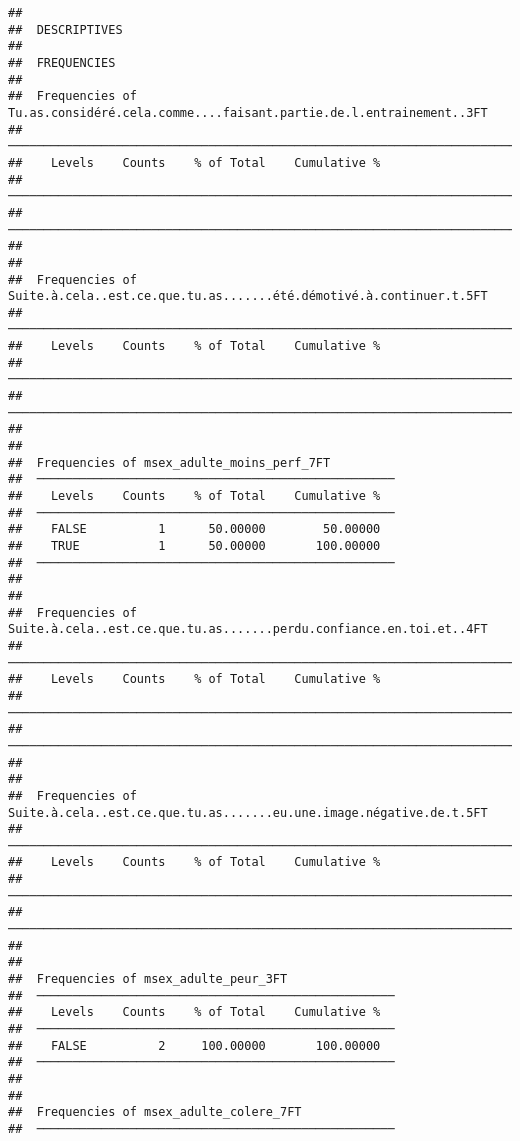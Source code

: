 \documentclass[
]{article}
\begin{document}
\begin{verbatim}
## 
##  DESCRIPTIVES
## 
##  FREQUENCIES
## 
##  Frequencies of Tu.as.considéré.cela.comme....faisant.partie.de.l.entrainement..3FT 
##  ────────────────────────────────────────────────────────────────────────────────── 
##    Levels    Counts    % of Total    Cumulative %   
##  ────────────────────────────────────────────────────────────────────────────────── 
##  ────────────────────────────────────────────────────────────────────────────────── 
## 
## 
##  Frequencies of Suite.à.cela..est.ce.que.tu.as.......été.démotivé.à.continuer.t.5FT 
##  ────────────────────────────────────────────────────────────────────────────────── 
##    Levels    Counts    % of Total    Cumulative %   
##  ────────────────────────────────────────────────────────────────────────────────── 
##  ────────────────────────────────────────────────────────────────────────────────── 
## 
## 
##  Frequencies of msex_adulte_moins_perf_7FT          
##  ────────────────────────────────────────────────── 
##    Levels    Counts    % of Total    Cumulative %   
##  ────────────────────────────────────────────────── 
##    FALSE          1      50.00000        50.00000   
##    TRUE           1      50.00000       100.00000   
##  ────────────────────────────────────────────────── 
## 
## 
##  Frequencies of Suite.à.cela..est.ce.que.tu.as.......perdu.confiance.en.toi.et..4FT 
##  ────────────────────────────────────────────────────────────────────────────────── 
##    Levels    Counts    % of Total    Cumulative %   
##  ────────────────────────────────────────────────────────────────────────────────── 
##  ────────────────────────────────────────────────────────────────────────────────── 
## 
## 
##  Frequencies of Suite.à.cela..est.ce.que.tu.as.......eu.une.image.négative.de.t.5FT 
##  ────────────────────────────────────────────────────────────────────────────────── 
##    Levels    Counts    % of Total    Cumulative %   
##  ────────────────────────────────────────────────────────────────────────────────── 
##  ────────────────────────────────────────────────────────────────────────────────── 
## 
## 
##  Frequencies of msex_adulte_peur_3FT                
##  ────────────────────────────────────────────────── 
##    Levels    Counts    % of Total    Cumulative %   
##  ────────────────────────────────────────────────── 
##    FALSE          2     100.00000       100.00000   
##  ────────────────────────────────────────────────── 
## 
## 
##  Frequencies of msex_adulte_colere_7FT              
##  ────────────────────────────────────────────────── 

\end{verbatim}
\end{document}
